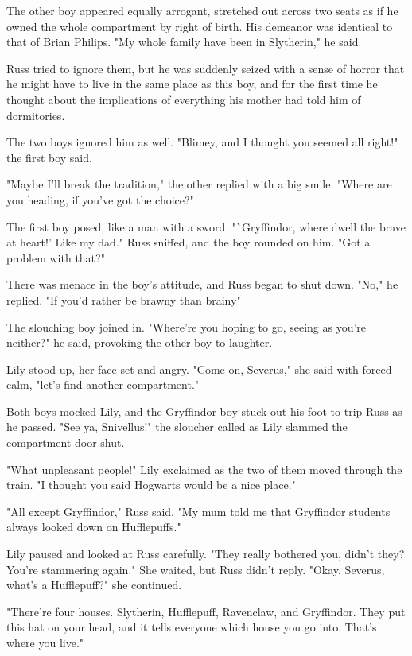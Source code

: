 The other boy appeared equally arrogant, stretched out across two seats as if he owned the whole compartment by right of birth. His demeanor was identical to that of Brian Philips. "My whole family have been in Slytherin," he said.

Russ tried to ignore them, but he was suddenly seized with a sense of horror that he might have to live in the same place as this boy, and for the first time he thought about the implications of everything his mother had told him of dormitories.

The two boys ignored him as well. "Blimey, and I thought you seemed all right!" the first boy said.

"Maybe I'll break the tradition," the other replied with a big smile. "Where are you heading, if you've got the choice?"

The first boy posed, like a man with a sword. "`Gryffindor, where dwell the brave at heart!' Like my dad." Russ sniffed, and the boy rounded on him. "Got a problem with that?"

There was menace in the boy's attitude, and Russ began to shut down. "No," he replied. "If you'd rather be brawny than brainy{\el}"

The slouching boy joined in. "Where're you hoping to go, seeing as you're neither?" he said, provoking the other boy to laughter.

Lily stood up, her face set and angry. "Come on, Severus," she said with forced calm, "let's find another compartment."

Both boys mocked Lily, and the Gryffindor boy stuck out his foot to trip Russ as he passed. "See ya, Snivellus!" the sloucher called as Lily slammed the compartment door shut.

"What unpleasant people!" Lily exclaimed as the two of them moved through the train. "I thought you said Hogwarts would be a nice place."

"All except{\el} Gryffindor," Russ said. "My mum told me that{\el} Gryffindor students always looked{\el} down on Hufflepuffs."

Lily paused and looked at Russ carefully. "They really bothered you, didn't they? You're stammering again." She waited, but Russ didn't reply. "Okay, Severus, what's a Hufflepuff?" she continued.

"There're four{\el} houses. Slytherin, Hufflepuff, Ravenclaw, and{\el} Gryffindor. They put this hat on your{\el} head, and it tells everyone which{\el} house you go into. That's where you live."


